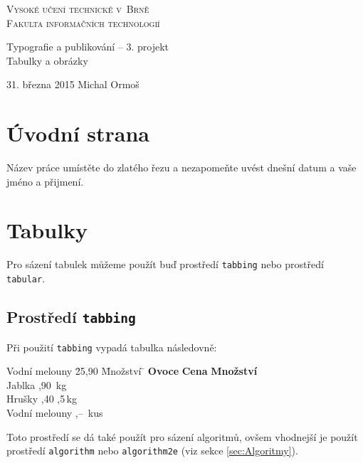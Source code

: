 \documentclass[a4paper, 11pt]{article}
\begin{document}
\begin{titlepage}
\begin{center}
\huge
\textsc{\Huge Vysoké učení technické v~Brně
\\\huge Fakulta informačních technologií}

\Large{Typografie a publikování -- 3. projekt}\\
\Huge{Tabulky a obrázky}
\end{center}

{\Large 31. března 2015 \hfill Michal Ormoš}
\end{titlepage}

\newpage
\pagestyle{plain}

\section{Úvodní strana}
Název práce umístěte do zlatého řezu a nezapomeňte uvést dnešní datum a vaše jméno a přijmení.

\section{Tabulky}
Pro sázení tabulek můžeme použít buď prostředí \texttt{tabbing} nebo prostředí \texttt{tabular}.

\subsection{Prostředí \texttt{tabbing}}
Při použití \texttt{tabbing} vypadá tabulka následovně:
\begin{tabbing}

Vodní melouny \quad \= 25,90 \quad \= Množství \= \kill
\textbf{Ovoce}\> \textbf{Cena}\> \textbf{Množství}\\
Jablka ,90 \,kg\\
Hrušky ,40 ,5\,kg\\
Vodní melouny ,-- \,kus\\
\end{tabbing}

\noindent Toto prostředí se dá také použít pro sázení algoritmů, ovšem vhodnejší je použít prostředí \texttt{algorithm} nebo \texttt{algorithm2e}  (viz sekce \ref{sec:Algoritmy}).
\end{document}
